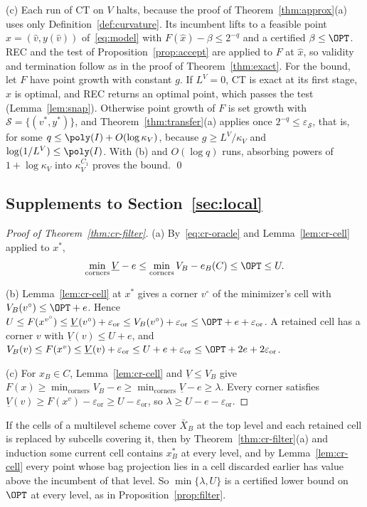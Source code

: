 (c) Each run of CT on $V$ halts, because the proof of
Theorem~\ref{thm:approx}(a) uses only Definition~\ref{def:curvature}. Its
incumbent lifts to a feasible point $\hat x=(\hat v,y(\hat v))$
of~\eqref{eq:model} with $F(\hat x)-\beta\le2^{-q}$ and a certified
$\beta\le\OPT$. REC and the test of Proposition~\ref{prop:accept} are
applied to $F$ at $\hat x$, so validity and termination follow as in the
proof of Theorem~\ref{thm:exact}. For the bound, let $F$ have point growth
with constant $g$. If $L^V=0$, CT is exact at its first stage, $\hat x$ is
optimal, and REC returns an optimal point, which passes the test
(Lemma~\ref{lem:snap}). Otherwise point growth of $F$ is set growth with
$\mathcal S=\{(v^*,y^*)\}$, and Theorem~\ref{thm:transfer}(a) applies once
$2^{-q}\le\varepsilon_{\mathcal S}$, that is, for some
$q\le\poly(I)+O(\log\kappa_V)$, because $g\ge L^V/\kappa_V$ and
$\log(1/L^V)\le\poly(I)$. With (b) and $O(\log q)$ runs, absorbing powers of
$1+\log\kappa_V$ into $\kappa_V^{C_1}$ proves the bound.
\qed

\subsection{Supplements to Section~\ref{sec:local}}

\begin{proof}[Proof of Theorem~\ref{thm:cr-filter}]
(a) By~\eqref{eq:cr-oracle} and Lemma~\ref{lem:cr-cell} applied to $x^*$,
\[
\min_{\text{corners}}\underline V-e\le\min_{\text{corners}}V_B-e_B(C)\le\OPT\le U.
\]

(b) Lemma~\ref{lem:cr-cell} at $x^*$ gives a corner $v^\circ$ of the
minimizer's cell with $V_B(v^\circ)\le\OPT+e$. Hence
$U\le F(x^{v^\circ})\le\underline V(v^\circ)+\varepsilon_{\mathrm{or}}\le V_B(v^\circ)+\varepsilon_{\mathrm{or}}\le\OPT+e+\varepsilon_{\mathrm{or}}$.
A retained cell has a corner $v$ with $\underline V(v)\le U+e$, and
$V_B(v)\le F(x^v)\le\underline V(v)+\varepsilon_{\mathrm{or}}\le U+e+\varepsilon_{\mathrm{or}}\le\OPT+2e+2\varepsilon_{\mathrm{or}}$.

(c) For $x_B\in C$, Lemma~\ref{lem:cr-cell} and $\underline V\le V_B$ give
$F(x)\ge\min_{\text{corners}}V_B-e\ge\min_{\text{corners}}\underline V-e\ge\lambda$.
Every corner satisfies $\underline V(v)\ge F(x^v)-\varepsilon_{\mathrm{or}}\ge U-\varepsilon_{\mathrm{or}}$, so
$\lambda\ge U-e-\varepsilon_{\mathrm{or}}$.
\end{proof}

If the cells of a multilevel scheme cover $\bar X_B$ at the top level and
each retained cell is replaced by subcells covering it, then by
Theorem~\ref{thm:cr-filter}(a) and induction some current cell contains $x^*_B$ at every level, and by
Lemma~\ref{lem:cr-cell} every point whose bag projection lies in a cell
discarded earlier has value above the incumbent of that level. So
$\min\{\lambda,U\}$ is a certified lower bound on $\OPT$ at every level, as
in Proposition~\ref{prop:filter}.


